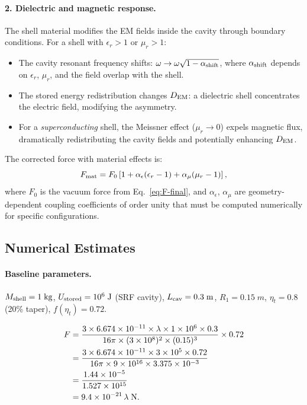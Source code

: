 \documentclass[aps,prd,twocolumn,superscriptaddress,floatfix,nofootinbib]{revtex4-2}
\newcommand{\lam}{\lambda}
\begin{document}
\paragraph{2. Dielectric and magnetic response.}
The shell material modifies the EM fields inside the cavity through
boundary conditions. For a shell with $\epsilon_r > 1$ or
$\mu_r > 1$:
\begin{itemize}[nosep]
\item The cavity resonant frequency shifts:
$\omega \to \omega\sqrt{1 - \alpha_{\rm shift}}$, where
$\alpha_{\rm shift}$ depends on $\epsilon_r$, $\mu_r$, and the
field overlap with the shell.
\item The stored energy redistribution changes $D_{\rm EM}$:
a dielectric shell concentrates the electric field, modifying
the asymmetry.
\item For a \emph{superconducting} shell, the Meissner effect
($\mu_r \to 0$) expels magnetic flux, dramatically redistributing
the cavity fields and potentially enhancing $D_{\rm EM}$.
\end{itemize}

The corrected force with material effects is:
\begin{equation}
F_{\rm mat} = F_0\left[1 + \alpha_\epsilon(\epsilon_r - 1)
+ \alpha_\mu(\mu_r - 1)\right],
\label{eq:F-material}
\end{equation}
where $F_0$ is the vacuum force from Eq.~\eqref{eq:F-final}, and
$\alpha_\epsilon$, $\alpha_\mu$ are geometry-dependent coupling
coefficients of order unity that must be computed numerically for
specific configurations.

\subsection{Numerical Estimates}
\label{sec:numerical}

\paragraph{Baseline parameters.}
$M_{\rm shell} = 1\;\si{kg}$, $U_{\rm stored} = 10^6\;\si{J}$
(SRF cavity), $L_{\rm cav} = 0.3\;\si{m}$, $R_1 = 0.15\;\si{m}$,
$\eta_t = 0.8$ (20\% taper), $f(\eta_t) = 0.72$.

\begin{align}
F &= \frac{3 \times 6.674\times10^{-11} \times \lam \times 1
\times 10^6 \times 0.3}{16\pi \times (3\times10^8)^2
\times (0.15)^3} \times 0.72 \notag\\
&= \frac{3 \times 6.674\times10^{-11} \times 3\times10^5 \times 0.72}
{16\pi \times 9\times10^{16} \times 3.375\times10^{-3}}
\notag\\
&= \frac{1.44\times10^{-5}}{1.527\times10^{15}}
\notag\\
&= 9.4 \times 10^{-21}\,\lam\;\si{N}.
\end{align}
\end{document}
